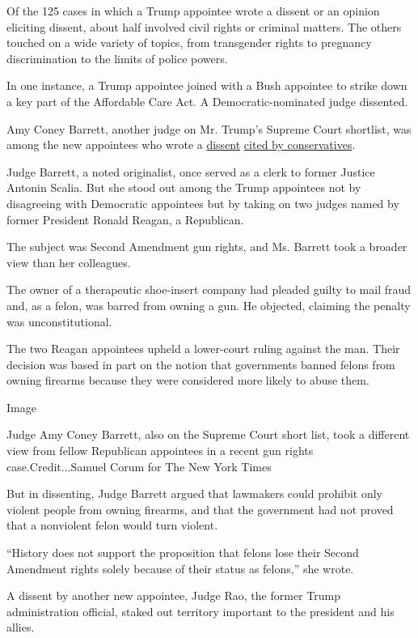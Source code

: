Of the 125 cases in which a Trump appointee wrote a dissent or an
opinion eliciting dissent, about half involved civil rights or criminal
matters. The others touched on a wide variety of topics, from
transgender rights to pregnancy discrimination to the limits of police
powers.

In one instance, a Trump appointee joined with a Bush appointee to
strike down a key part of the Affordable Care Act. A
Democratic-nominated judge dissented.

Amy Coney Barrett, another judge on Mr. Trump's Supreme Court shortlist,
was among the new appointees who wrote a
\href{http://media.ca7.uscourts.gov/cgi-bin/rssExec.pl?Submit=Display\&Path=Y2019/D03-15/C:18-1478:J:Flaum:aut:T:fnOp:N:2309276:S:0}{dissent}
\href{https://www.nationalreview.com/bench-memos/judge-barretts-dissent-in-second-amendment-case/}{cited
by conservatives}.

Judge Barrett, a noted originalist, once served as a clerk to former
Justice Antonin Scalia. But she stood out among the Trump appointees not
by disagreeing with Democratic appointees but by taking on two judges
named by former President Ronald Reagan, a Republican.

The subject was Second Amendment gun rights, and Ms. Barrett took a
broader view than her colleagues.

The owner of a therapeutic shoe-insert company had pleaded guilty to
mail fraud and, as a felon, was barred from owning a gun. He objected,
claiming the penalty was unconstitutional.

The two Reagan appointees upheld a lower-court ruling against the man.
Their decision was based in part on the notion that governments banned
felons from owning firearms because they were considered more likely to
abuse them.

Image

Judge Amy Coney Barrett, also on the Supreme Court short list, took a
different view from fellow Republican appointees in a recent gun rights
case.Credit...Samuel Corum for The New York Times

But in dissenting, Judge Barrett argued that lawmakers could prohibit
only violent people from owning firearms, and that the government had
not proved that a nonviolent felon would turn violent.

``History does not support the proposition that felons lose their Second
Amendment rights solely because of their status as felons,'' she wrote.

A dissent by another new appointee, Judge Rao, the former Trump
administration official, staked out territory important to the president
and his allies.

